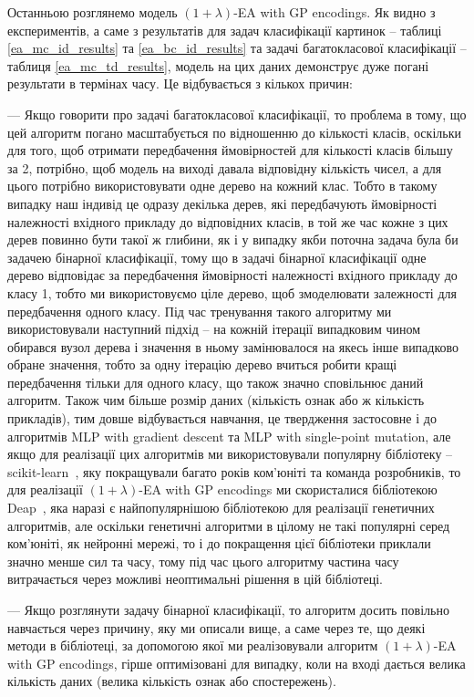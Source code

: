 Останньою розглянемо модель $(1+\lambda)$-EA with GP encodings. Як видно з експериментів, а саме з результатів для задач класифікації картинок -- таблиці \ref{ea_mc_id_results} та \ref{ea_bc_id_results} та задачі багатокласової класифікації -- таблиця \ref{ea_mc_td_results}, модель на цих даних демонструє дуже погані результати в термінах часу. Це відбувається з кількох причин: 

--- Якщо говорити про задачі багатокласової класифікації, то проблема в тому, що цей алгоритм погано масштабується по відношенню до кількості класів, оскільки для того, щоб отримати передбачення ймовірностей для кількості класів більшу за 2, потрібно, щоб модель на виході давала відповідну кількість чисел, а для цього потрібно використовувати одне дерево на кожний клас. Тобто в такому випадку наш індивід це одразу декілька дерев, які передбачують ймовірності належності вхідного прикладу до відповідних класів, в той же час кожне з цих дерев повинно бути такої ж глибини, як і у випадку якби поточна задача була би задачею бінарної класифікації, тому що в задачі бінарної класифікації одне дерево відповідає за передбачення ймовірності належності вхідного прикладу до класу 1, тобто ми використовуємо ціле дерево, щоб змоделювати залежності для передбачення одного класу. Під час тренування такого алгоритму ми використовували наступний підхід -- на кожній ітерації випадковим чином обирався вузол дерева і значення в ньому замінювалося на якесь інше випадково обране значення, тобто за одну ітерацію дерево вчиться робити кращі передбачення тільки для одного класу, що також значно сповільнює даний алгоритм. Також чим більше розмір даних (кількість ознак або ж кількість прикладів), тим довше відбувається навчання, це твердження застосовне і до алгоритмів MLP with gradient descent та MLP with single-point mutation, але якщо для реалізації цих алгоритмів ми використовували популярну бібліотеку -- scikit-learn~\cite{ct20}, яку покращували багато років ком'юніті та команда розробників, то для реалізації $(1+\lambda)$-EA with GP encodings ми скористалися бібліотекою Deap~\cite{ct19}, яка наразі є найпопулярнішою бібліотекою для реалізації генетичних алгоритмів, але оскільки генетичні алгоритми в цілому не такі популярні серед ком'юніті, як нейронні мережі, то і до покращення цієї бібліотеки приклали значно менше сил та часу, тому під час цього алгоритму частина часу витрачається через можливі неоптимальні рішення в цій бібліотеці.

--- Якщо розглянути задачу бінарної класифікації, то алгоритм досить повільно навчається через причину, яку ми описали вище, а саме через те, що деякі методи в бібліотеці, за допомогою якої ми реалізовували алгоритм $(1+\lambda)$-EA with GP encodings, гірше оптимізовані для випадку, коли на вході дається велика кількість даних (велика кількість ознак або спостережень).

